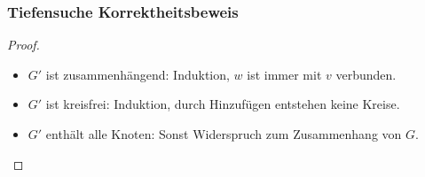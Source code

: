 \begin{frame}[t]
    \frametitle{Tiefensuche Korrektheitsbeweis}
    \begin{proof}
        \begin{itemize}
            \item<1-> $G'$ ist zusammenhängend: Induktion, $w$ ist immer mit $v$ verbunden.
            \item<2-> $G'$ ist kreisfrei: Induktion, durch Hinzufügen entstehen keine Kreise.
            \item<3-> $G'$ enthält alle Knoten: Sonst Widerspruch zum Zusammenhang von $G$.
        \end{itemize}
    \end{proof}
\end{frame}
